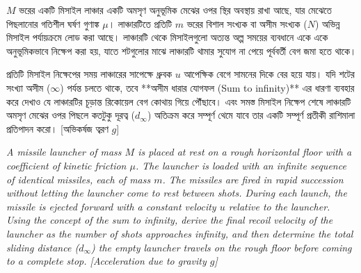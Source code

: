 \documentclass[12pt, a4paper]{article}
\begin{document}
\begin{tcolorbox}[questionbox={প্রশ্ন (Question) 3}]
\noindent
$M$ ভরের একটি মিসাইল লাঞ্চার একটি অমসৃণ অনুভূমিক মেঝের ওপর স্থির অবস্থায় রাখা আছে, যার মেঝেতে পিছলানোর গতিশীল ঘর্ষণ গুণাঙ্ক $\mu$। লাঞ্চারটিতে প্রতিটি $m$ ভরের বিশাল সংখ্যক বা অসীম সংখ্যক ($N$) অভিন্ন মিসাইল পর্যায়ক্রমে লোড করা আছে। লাঞ্চারটি থেকে মিসাইলগুলো অত্যন্ত অল্প সময়ের ব্যবধানে একে একে অনুভূমিকভাবে নিক্ষেপ করা হয়, যাতে শটগুলোর মাঝে লাঞ্চারটি থামার সুযোগ না পেয়ে পূর্ববর্তী বেগ জমা হতে থাকে। 

\vspace{0.3em}
\noindent
প্রতিটি মিসাইল নিক্ষেপের সময় লাঞ্চারের সাপেক্ষে ধ্রুবক $u$ আপেক্ষিক বেগে সামনের দিকে বের হয়ে যায়। যদি শটের সংখ্যা অসীম ($\infty$) পর্যন্ত চলতে থাকে, তবে **অসীম ধারার যোগফল (Sum to infinity)** এর ধারণা ব্যবহার করে দেখাও যে লাঞ্চারটির চূড়ান্ত রিকোয়েল বেগ কোথায় গিয়ে পৌঁছাবে। এবং সমস্ত মিসাইল নিক্ষেপ শেষে লাঞ্চারটি অমসৃণ মেঝের ওপর পিছলে কতটুকু দূরত্ব ($d_\infty$) অতিক্রম করে সম্পূর্ণ থেমে যাবে তার একটি সম্পূর্ণ প্রতীকী রাশিমালা প্রতিপাদন করো। [অভিকর্ষজ ত্বরণ $g$]

\vspace{0.8em}
\begin{english}
\noindent\textit{\color{darkgray}
A missile launcher of mass $M$ is placed at rest on a rough horizontal floor with a coefficient of kinetic friction $\mu$. The launcher is loaded with an infinite sequence of identical missiles, each of mass $m$. The missiles are fired in rapid succession without letting the launcher come to rest between shots. During each launch, the missile is ejected forward with a constant velocity $u$ relative to the launcher. Using the concept of the sum to infinity, derive the final recoil velocity of the launcher as the number of shots approaches infinity, and then determine the total sliding distance ($d_\infty$) the empty launcher travels on the rough floor before coming to a complete stop. [Acceleration due to gravity $g$]
}
\end{english}
\end{tcolorbox}
\end{document}
